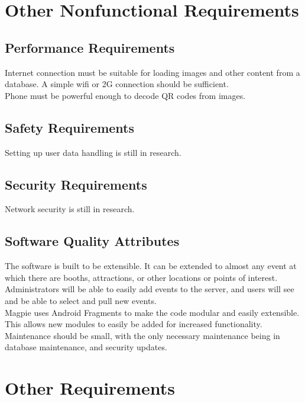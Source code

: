\documentclass{scrreprt}
\begin{document}
\chapter{Other Nonfunctional Requirements}

\section{Performance Requirements}
Internet connection must be suitable for loading images and other content from a
database. A simple wifi or 2G connection should be sufficient. \\
Phone must be powerful enough to decode QR codes from images.

\section{Safety Requirements}
Setting up user data handling is still in research.

\section{Security Requirements}
Network security is still in research.

\section{Software Quality Attributes}
The software is built to be extensible. It can be extended to almost any event at
which there are booths, attractions, or other locations or points of interest. \\
Administrators will be able to easily add events to the server, and users will see
and be able to select and pull new events. \\
Magpie uses Android Fragments to make the code modular and easily extensible.
This allows new modules to easily be added for increased functionality. \\
Maintenance should be small, with the only necessary maintenance being in
database maintenance, and security updates. \\

\chapter{Other Requirements}
\end{document}
